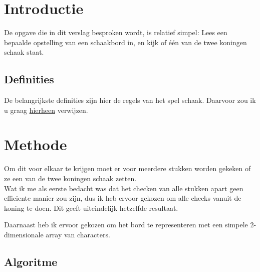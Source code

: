 \documentclass[a4paper,12pt]{article}
\begin{document}

\section{Introductie}

De opgave die in dit verslag besproken wordt, is relatief simpel: Lees een
bepaalde opstelling van een schaakbord in, en kijk of \'e\'en van de twee
koningen schaak staat.

\subsection{Definities}

De belangrijkste definities zijn hier de regels van het spel schaak. Daarvoor
zou ik u graag \href{http://www.chessvariants.org/d.chess/chess-dutch.html}
{hierheen} verwijzen.




\section{Methode}

Om dit voor elkaar te krijgen moet er voor meerdere stukken worden gekeken of
ze een van de twee koningen schaak zetten.\\

Wat ik me als eerste bedacht was dat het checken van alle stukken apart geen
efficiente manier zou zijn, dus ik heb ervoor gekozen om alle checks vanuit de
koning te doen. Dit geeft uiteindelijk hetzelfde resultaat.

Daarnaast heb ik ervoor gekozen om het bord te representeren met een simpele
2-dimensionale array van characters.

\subsection{Algoritme}
\end{document}
